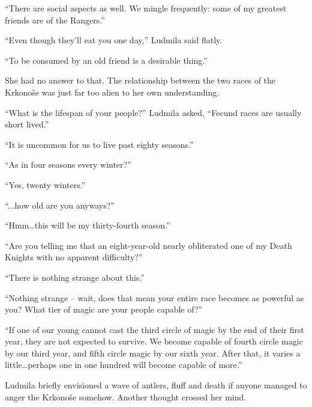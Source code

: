 “There are social aspects as well. We mingle frequently: some of my greatest friends are of the Rangers.”

 

“Even though they’ll eat you one day,” Ludmila said flatly.

 

“To be consumed by an old friend is a desirable thing.”

 

She had no answer to that. The relationship between the two races of the Krkonoše was just far too alien to her own understanding.

 

“What is the lifespan of your people?” Ludmila asked, “Fecund races are usually short lived.”

 

“It is uncommon for us to live past eighty seasons.”

 

“As in four seasons every winter?”

 

“Yes, twenty winters.”

 

“...how old are you anyways?”

 

“Hmm…this will be my thirty-fourth season.”

 

“Are you telling me that an eight-year-old nearly obliterated one of my Death Knights with no apparent difficulty?”

 

“There is nothing strange about this.”

 

“Nothing strange – wait, does that mean your entire race becomes as powerful as you? What tier of magic are your people capable of?”

 

“If one of our young cannot cast the third circle of magic by the end of their first year, they are not expected to survive. We become capable of fourth circle magic by our third year, and fifth circle magic by our sixth year. After that, it varies a little…perhaps one in one hundred will become capable of more.”

 

Ludmila briefly envisioned a wave of antlers, fluff and death if anyone managed to anger the Krkonoše somehow. Another thought crossed her mind.

 

